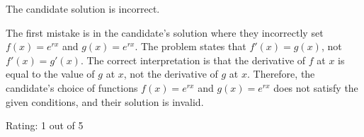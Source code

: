 The candidate solution is incorrect.

The first mistake is in the candidate's solution where they incorrectly set $f(x) = e^{rx}$ and $g(x) = e^{rx}$. The problem states that $f'(x) = g(x)$, not $f'(x) = g'(x)$. The correct interpretation is that the derivative of $f$ at $x$ is equal to the value of $g$ at $x$, not the derivative of $g$ at $x$. Therefore, the candidate's choice of functions $f(x) = e^{rx}$ and $g(x) = e^{rx}$ does not satisfy the given conditions, and their solution is invalid.

Rating: 1 out of 5
